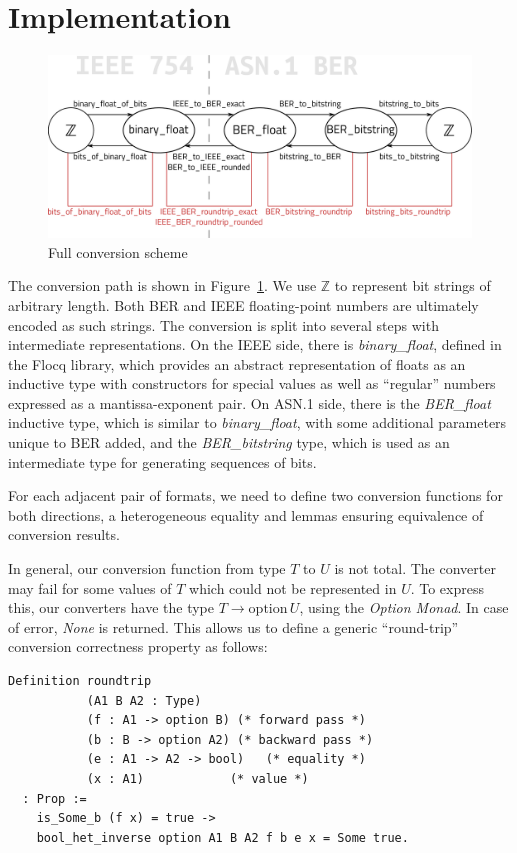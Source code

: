 \documentclass[sigplan]{acmart}
\newcommand{\Z}{\mathbb{Z}}
\begin{document}
\section{Implementation}
\label{sec:imp}
\begin{figure}[h!]
  \includegraphics[width=\columnwidth]{diagram.eps}
  \caption{Full conversion scheme}
  \label{fig:figure1}
\end{figure}

The conversion path is shown in Figure~\ref{fig:figure1}. We use $\Z$ to
represent bit strings of arbitrary length. Both BER and IEEE floating-point
numbers are ultimately encoded as such strings. The conversion is split into
several steps with intermediate representations. On the IEEE side, there is
\emph{binary\_float}, defined in the Flocq \cite{boldo2011flocq} library, which provides
an abstract representation of floats as an inductive type with constructors for
special values as well as ``regular'' numbers expressed as a mantissa-exponent
pair. On ASN.1 side, there is the \emph{BER\_float} inductive type, which is similar
to \emph{binary\_float}, with some additional parameters unique to BER added, and the
\emph{BER\_bitstring} type, which is used as an intermediate type for generating sequences of bits.

For each adjacent pair of formats, we need to define two conversion functions
for both directions, a heterogeneous equality and lemmas ensuring equivalence
of conversion results.

In general, our conversion function from type $T$ to $U$ is not total.
The converter may fail for some values of $T$ which could not be
represented in $U$. To express this, our converters have the type $T \rightarrow \mathrm{option}\, U$,
using the \emph{Option Monad}. In case of error, \emph{None} is returned.
This allows us to define a generic ``round-trip'' conversion correctness property as follows:

\begin{lstlisting}[language=Coq, mathescape=true,
  basicstyle=\footnotesize]
Definition roundtrip
           (A1 B A2 : Type)
           (f : A1 -> option B) (* forward pass *)
           (b : B -> option A2) (* backward pass *)
           (e : A1 -> A2 -> bool)   (* equality *)
           (x : A1)            (* value *)
  : Prop :=
    is_Some_b (f x) = true ->
    bool_het_inverse option A1 B A2 f b e x = Some true.
\end{lstlisting}
\end{document}
